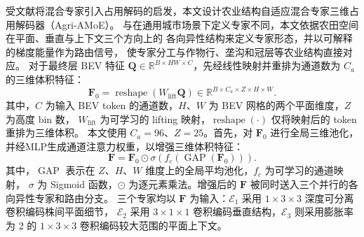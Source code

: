 \documentclass[a4paper,fleqn]{cas-sc}
\newcommand{\R}{\mathbb{R}}
\begin{document}
受文献\citep{shi2026oneocc}将混合专家引入占用解码的启发，本文设计农业结构自适应混合专家三维占用解码器（Agri-AMoE）。
与在通用城市场景下定义专家不同，本文依据农田空间在平面、垂直与上下文三个方向上的
各向异性结构来定义专家形态，并以可解释的梯度能量作为路由信号，
使专家分工与作物行、垄沟和冠层等农业结构直接对应。
对于最终层 BEV 特征 $\bm{Q}\in\R^{B\times HW\times C}$，先经线性映射并重排为通道数为 $C_a$ 的三维体积特征：
\begin{equation}
\bm{F}_0=\operatorname{reshape}(W_{\mathrm{lift}}\bm{Q})\in\R^{B\times C_a\times Z\times H\times W}.
\end{equation}
其中，$C$ 为输入 BEV token 的通道数，$H$、$W$ 为 BEV 网格的两个平面维度，$Z$ 为高度 bin 数，
$W_{\mathrm{lift}}$ 为可学习的 lifting 映射，$\operatorname{reshape}(\cdot)$ 仅将映射后的 token 重排为三维体积。
本文使用 $C_a=96$、$Z=25$。首先，对 $\bm{F}_0$ 进行全局三维池化，并经MLP生成通道注意力权重，以增强三维体积特征：
\begin{equation}
\bm{F}=\bm{F}_0\odot\sigma\!\left(f_c(\operatorname{GAP}(\bm{F}_0))\right).
\end{equation}
其中，$\operatorname{GAP}$ 表示在 $Z$、$H$、$W$ 维度上的全局平均池化，$f_c$ 为可学习的通道映射，
$\sigma$ 为 Sigmoid 函数，$\odot$ 为逐元素乘法。增强后的 $\bm{F}$ 被同时送入三个并行的各向异性专家和路由分支。
三个专家均以 $\bm{F}$ 为输入：$\mathcal{E}_1$ 采用 $1\times3\times3$ 深度可分离卷积编码株间平面细节，
$\mathcal{E}_2$ 采用 $3\times1\times1$ 卷积编码垂直结构，$\mathcal{E}_3$ 则采用膨胀率为 2 的 $1\times3\times3$ 卷积编码较大范围的平面上下文。
\end{document}

